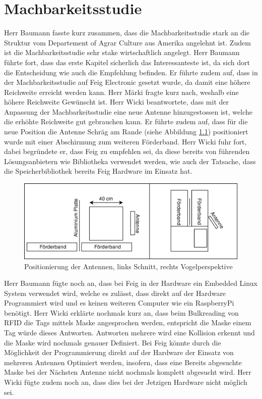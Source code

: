 \documentclass[parskip=full, a4paper]{scrreprt}
\begin{document}
\chapter{Machbarkeitsstudie}
Herr Baumann fasste kurz zusammen, dass die Machbarkeitsstudie stark an die Struktur vom Departement of Agrar Culture aus Amerika angelehnt ist. Zudem ist die Machbarkeitsstudie sehr stake wirtschaftlich angelegt. Herr Baumann führte fort, dass das erste Kapitel sicherlich das Interessanteste ist, da sich dort die Entscheidung wie auch die Empfehlung befinden. Er führte zudem auf, dass in der Machbarkeitsstudie auf Feig Electronic gesetzt wurde, da damit eine höhere Reichweite erreicht werden kann. Herr Märki fragte kurz nach, weshalb eine höhere Reichweite Gewünscht ist. Herr Wicki beantwortete, dass mit der Anpassung der Machbarkeitsstudie eine neue Antenne hinzugestossen ist, welche die erhöhte Reichweite gut gebrauchen kann. Er führte zudem auf, dass für die neue Position die Antenne Schräg am Rande (siehe Abbildung \ref{fig:antenneSchraeg}) positioniert wurde mit einer Abschirmung zum weiteren Förderband. Herr Wicki fuhr fort, dabei begründete er, dass Feig zu empfehlen sei, da diese bereits von führenden Lösungsanbietern wie Bibliotheka verwendet werden, wie auch der Tatsache, dass die Speicherbibliothek bereits Feig Hardware im Einsatz hat. 
\begin{figure}[htb]
	\centering
	\includegraphics[keepaspectratio,width=.6\linewidth]{img/PositionierungAntennen}
	\caption{Positionierung der Antennen, links Schnitt, rechts Vogelperspektive}
	\label{fig:antenneSchraeg}
\end{figure}
Herr Baumann fügte noch an, dass bei Feig in der Hardware ein Embedded Linux System verwendet wird, welche es zulässt, dass direkt auf der Hardware Programmiert wird und es keinen weiteren Computer wie ein RaspberryPi benötigt. Herr Wicki erklärte nochmals kurz an, dass beim Bulkreading von RFID die Tags mittels Maske angesprochen werden, entspricht die Maske einem Tag würde dieses Antworten. Antworten mehrere wird eine Kollision erkennt und die Maske wird nochmals genauer Definiert. Bei Feig könnte durch die Möglichkeit der Programmierung direkt auf der Hardware der Einsatz von mehreren Antennen Optimiert werden, insofern, dass eine Bereits abgesuchte Maske bei der Nächsten Antenne nicht nochmals komplett abgesucht wird. Herr Wicki fügte zudem noch an, dass dies bei der Jetzigen Hardware nicht möglich sei.
\end{document}
